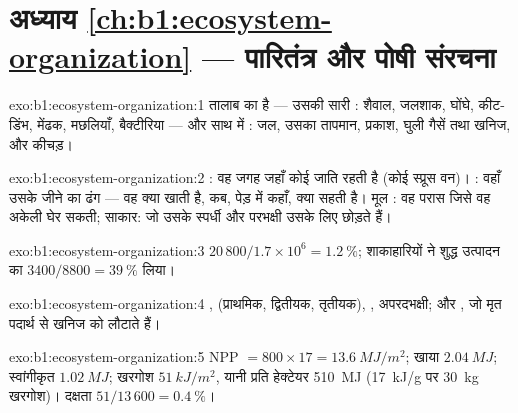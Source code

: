 \section*{अध्याय \ref{ch:b1:ecosystem-organization} --- पारितंत्र और पोषी संरचना}

\begin{solution}{exo:b1:ecosystem-organization:1}
तालाब का   है --- उसकी सारी : शैवाल,
जलशाक, घोंघे, कीट-डिंभ, मेंढक, मछलियाँ, बैक्टीरिया --- और साथ में
: जल, उसका तापमान, प्रकाश, घुली गैसें
तथा खनिज, और कीचड़।
\end{solution}

\begin{solution}{exo:b1:ecosystem-organization:2}
: वह जगह जहाँ कोई जाति रहती है (कोई स्प्रूस वन)। : वहाँ उसके
जीने का ढंग --- वह क्या खाती है, कब, पेड़ में कहाँ, क्या
सहती है। मूल : वह परास जिसे वह अकेली घेर सकती;
साकार: जो उसके स्पर्धी और परभक्षी उसके लिए छोड़ते हैं।
\end{solution}

\begin{solution}{exo:b1:ecosystem-organization:3}
$20\,800/1.7\times 10^6 = \qty{1.2}{\%}$; शाकाहारियों ने शुद्ध उत्पादन
का $3400/8800 = \qty{39}{\%}$ लिया।
\end{solution}

\begin{solution}{exo:b1:ecosystem-organization:4}
,  (प्राथमिक, द्वितीयक, तृतीयक), ,
अपरदभक्षी; और , जो मृत पदार्थ से खनिज
 को लौटाते हैं।
\end{solution}

\begin{solution}{exo:b1:ecosystem-organization:5}
NPP $= 800\times 17 = \qty{13.6}{MJ/m^2}$; खाया $\qty{2.04}{MJ}$;
स्वांगीकृत $\qty{1.02}{MJ}$; खरगोश $\qty{51}{kJ/m^2}$, यानी
प्रति हेक्टेयर \qty{510}{MJ} (\qty{17}{kJ/g} पर \qty{30}{kg} खरगोश)।
दक्षता $51/13\,600 = \qty{0.4}{\%}$।
\end{solution}

